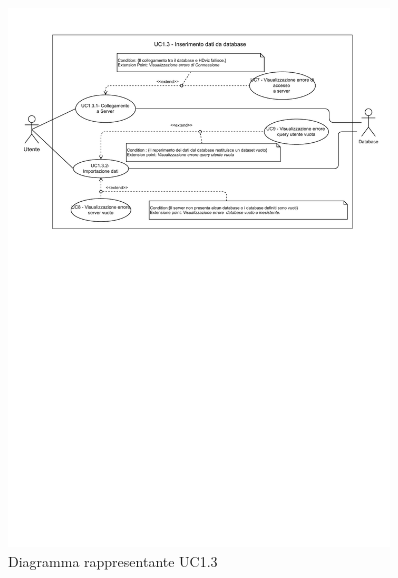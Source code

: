 \newpage
\begin{figure}[h]
    \centering
    \includegraphics[width=0.9\textwidth]{componenti/casi-duso/diagrammi/UC1_3.pdf}
    \caption{Diagramma rappresentante UC1.3}
    \label{fig:UC1.3}
\end{figure}



